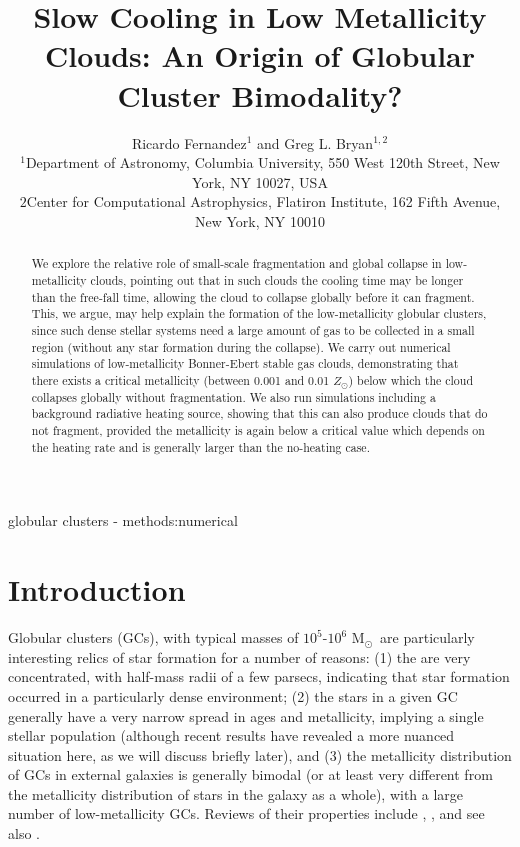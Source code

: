 \documentclass[useAMS,usenatbib]{mn2e}
\title{Slow Cooling in Low Metallicity Clouds: An Origin of Globular Cluster Bimodality?}
\author[R. Fernandez et al.]{Ricardo Fernandez$^{1}$ and Greg L. Bryan$^{1,2}$\\
$^{1}$Department of Astronomy, Columbia University, 550 West 120th Street, New York, NY 10027, USA \\
${2}$Center for Computational Astrophysics, Flatiron Institute, 162 Fifth Avenue, New York, NY 10010}
\newcommand{\msun}{{M$_\odot$}}
\begin{document}
\date{}


\maketitle


\begin{abstract}

We explore the relative role of small-scale fragmentation and global collapse in low-metallicity clouds, pointing out that in such clouds the cooling time may be longer than the free-fall time, allowing the cloud to collapse globally before it can fragment.  This, we argue, may help explain the formation of the low-metallicity globular clusters, since such dense stellar systems need a large amount of gas to be collected in a small region (without any star formation during the collapse).  We carry out numerical simulations of low-metallicity Bonner-Ebert stable gas clouds, demonstrating that there exists a critical metallicity (between 0.001 and 0.01 $Z_\odot$) below which the cloud collapses globally without fragmentation.  We also run simulations including a background radiative heating source, showing that this can also produce clouds that do not fragment, provided the metallicity is again below a critical value which depends on the heating rate and is generally larger than the no-heating case.

\end{abstract}

\begin{keywords}
globular clusters - methods:numerical
\end{keywords}

%
\section{Introduction}

Globular clusters (GCs), with typical masses of $10^5$-$10^6$ \msun\ are particularly interesting relics of star formation for a number of reasons: (1) the are very concentrated, with half-mass radii of a few parsecs, indicating that star formation occurred in a particularly dense environment; (2) the stars in a given GC generally have a very narrow spread in ages and metallicity, implying a single stellar population (although recent results have revealed a more nuanced situation here, as we will discuss briefly later), and (3) the metallicity distribution of GCs in external galaxies is generally bimodal (or at least very different from the metallicity distribution of stars in the galaxy as a whole), with a large number of low-metallicity GCs.  Reviews of their properties include \citet{Brodie2006}, \citet{Renzini2008, Renzini2013}, and see also \cite{zwart2010}.
\end{document}
